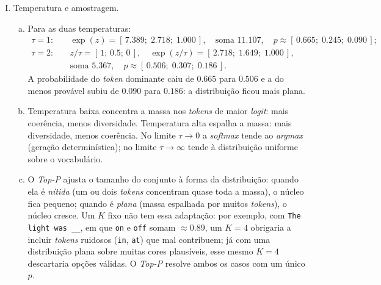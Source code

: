 \documentclass{dlproblemset}
\begin{document}
\begin{enumerate}[I)]
\item Temperatura e amostragem.
\begin{enumerate}[(a)]
    \item Para as duas temperaturas:
    \begin{align*}
        \tau = 1:&\quad \exp(z) = [\,7.389;\; 2.718;\; 1.000\,], \quad \text{soma } 11.107, \quad
        p \approx [\,0.665;\; 0.245;\; 0.090\,]; \\
        \tau = 2:&\quad z/\tau = [\,1;\, 0.5;\, 0\,], \quad \exp(z/\tau) = [\,2.718;\; 1.649;\; 1.000\,], \\
        &\quad \text{soma } 5.367, \quad p \approx [\,0.506;\; 0.307;\; 0.186\,].
    \end{align*}
    A probabilidade do
    \textit{token} dominante caiu de $0.665$ para $0.506$ e a do menos provável subiu de
    $0.090$ para $0.186$: a distribuição ficou mais plana.
    \item Temperatura baixa concentra a massa nos \textit{tokens} de maior \textit{logit}: mais
    coerência, menos diversidade. Temperatura alta espalha a massa: mais diversidade, menos
    coerência. No limite $\tau \to 0$ a \textit{softmax} tende ao \textit{argmax} (geração
    determinística); no limite $\tau \to \infty$ tende à distribuição uniforme sobre o
    vocabulário.
    \item O \textit{Top-P} ajusta o tamanho do conjunto à forma da distribuição: quando ela é
    \emph{nítida} (um ou dois \textit{tokens} concentram quase toda a massa), o núcleo fica
    pequeno; quando é \emph{plana} (massa espalhada por muitos \textit{tokens}), o núcleo cresce.
    Um $K$ fixo não tem essa adaptação: por exemplo, com \texttt{The light was \_\_}, em que
    \texttt{on} e \texttt{off} somam $\approx 0.89$, um $K = 4$ obrigaria a incluir
    \textit{tokens} ruidosos (\texttt{in}, \texttt{at}) que mal contribuem; já com uma
    distribuição plana sobre muitas cores plausíveis, esse mesmo $K = 4$ descartaria opções
    válidas. O \textit{Top-P} resolve ambos os casos com um único $p$.
\end{enumerate}


\end{enumerate}
\end{document}
